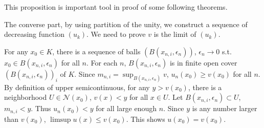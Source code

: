 This proposition is important tool in proof of some following theorems.
\begin{remark}
    The converse part, by using partition of the unity, we construct a sequence of decreasing function $(u_k)$. We need to prove $v$
    is the limit of $(u_k)$. \par
    For any $x_0\in K$, there is a sequence of balls $(B(x_{n,i},\epsilon_n))$, $\epsilon_n\to 0$ s.t. $x_0\in B(x_{n,i},\epsilon_n)$ for all $n$.
    For each $n$, $B(x_{n,i},\epsilon_n)$ is in finite open cover $(B(x_{n,i},\epsilon_n))_i$ of $K$. Since $m_{n,i}=\sup_{B(x_{n,i},\epsilon_n)}{v}$,
    $u_n(x_0)\geq v(x_0)$ for all $n$. By definition of upper semicontinuous, for any $y>v(x_0)$, there is a neighborhood $U\in \mathscr{N}(x_0)$,
    $v(x)<y$ for all $x\in U$. Let $B(x_{n,i},\epsilon_n)\subset U$, $m_{n,i}<y$. Thus $u_n(x_0)<y$ for all large enough $n$. Since $y$ is any number larger than $v(x_0)$, $\limsup{u(x)}\leq v(x_0)$.   This shows $u(x_0)=v(x_0)$.
\end{remark}


